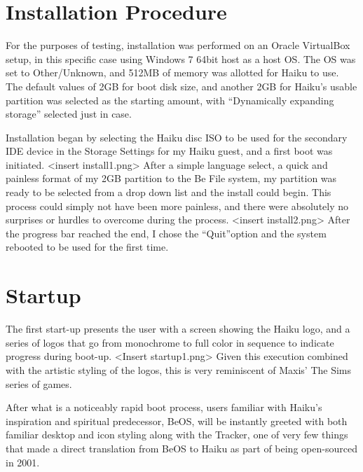 \documentclass{article}
\begin{document}
\section{Installation Procedure}



For the purposes of testing, installation was performed on an Oracle 
VirtualBox setup, in this specific case using Windows 7 64bit host as
a host OS. The OS was set to Other/Unknown, and 512MB of memory was 
allotted for Haiku to use. The default values of 2GB for boot disk size,
and another 2GB for Haiku’s usable partition was selected as the starting 
amount, with “Dynamically expanding storage” selected just in case.

Installation began by selecting the Haiku disc ISO to be used for 
the secondary IDE device in the Storage Settings for my Haiku guest, and 
a first boot was initiated. <insert install1.png> After a simple language 
select, a quick and painless format of my 2GB partition to the Be File 
system, my partition was ready to be selected from a drop down list and 
the install could begin. This process could simply not have been more 
painless, and there were absolutely no surprises or hurdles to overcome 
during the process. <insert install2.png> After the progress bar reached 
the end, I chose the “Quit”option and the system rebooted to  be used 
for the first time.

\section{Startup}

The first start-up presents the user with a screen showing the Haiku logo, 
and a series of logos that go from monochrome to full color in sequence 
to indicate progress during boot-up.  <Insert startup1.png> Given this 
execution combined with the artistic styling of the logos, this is very 
reminiscent of Maxis’ The Sims series of games.
 
After what is a noticeably rapid boot process, users familiar with Haiku’s 
inspiration and spiritual predecessor, BeOS, will be instantly greeted with 
both familiar desktop and icon styling along with the Tracker, one of very 
few things that made a direct translation from BeOS to Haiku as part of 
being open-sourced in 2001.\cite{HaikuFaq}
\end{document}
